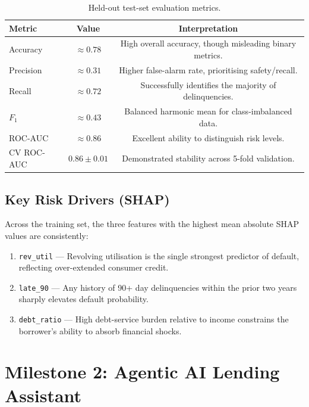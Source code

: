 \documentclass[11pt,a4paper]{article}
\begin{document}
\begin{table}[htbp]
\centering
\caption{Held-out test-set evaluation metrics.}
\label{tab:metrics}
\begin{tabular}{lcc}
\toprule
\textbf{Metric} & \textbf{Value} & \textbf{Interpretation} \\
\midrule
Accuracy   & $\approx 0.78$ & High overall accuracy, though misleading binary metrics. \\
Precision  & $\approx 0.31$ & Higher false-alarm rate, prioritising safety/recall. \\
Recall     & $\approx 0.72$ & Successfully identifies the majority of delinquencies. \\
$F_1$      & $\approx 0.43$ & Balanced harmonic mean for class-imbalanced data. \\
ROC-AUC    & $\approx 0.86$ & Excellent ability to distinguish risk levels. \\
CV ROC-AUC & $0.86 \pm 0.01$ & Demonstrated stability across 5-fold validation. \\
\bottomrule
\end{tabular}
\end{table}

\subsection{Key Risk Drivers (SHAP)}

Across the training set, the three features with the highest mean absolute SHAP values
are consistently:

\begin{enumerate}
    \item \texttt{rev\_util} — Revolving utilisation is the single strongest predictor of
          default, reflecting over-extended consumer credit.
    \item \texttt{late\_90} — Any history of 90+ day delinquencies within the prior
          two years sharply elevates default probability.
    \item \texttt{debt\_ratio} — High debt-service burden relative to income constrains
          the borrower's ability to absorb financial shocks.
\end{enumerate}

\section{Milestone 2: Agentic AI Lending Assistant}
\label{sec:agent}
\end{document}
